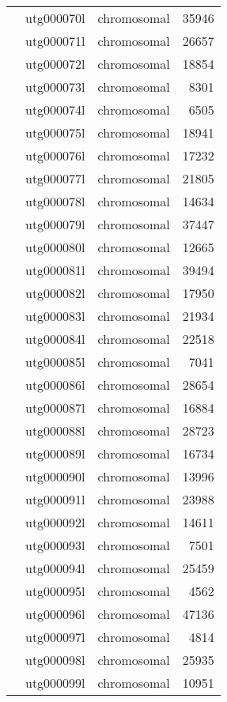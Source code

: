 {\begin{supertabular}{llcr}
          & utg000070l & chromosomal & 35946 \\
          & utg000071l & chromosomal & 26657 \\
          & utg000072l & chromosomal & 18854 \\
          & utg000073l & chromosomal & 8301 \\
          & utg000074l & chromosomal & 6505 \\
          & utg000075l & chromosomal & 18941 \\
          & utg000076l & chromosomal & 17232 \\
          & utg000077l & chromosomal & 21805 \\
          & utg000078l & chromosomal & 14634 \\
          & utg000079l & chromosomal & 37447 \\
          & utg000080l & chromosomal & 12665 \\
          & utg000081l & chromosomal & 39494 \\
          & utg000082l & chromosomal & 17950 \\
          & utg000083l & chromosomal & 21934 \\
          & utg000084l & chromosomal & 22518 \\
          & utg000085l & chromosomal & 7041 \\
          & utg000086l & chromosomal & 28654 \\
          & utg000087l & chromosomal & 16884 \\
          & utg000088l & chromosomal & 28723 \\
          & utg000089l & chromosomal & 16734 \\
          & utg000090l & chromosomal & 13996 \\
          & utg000091l & chromosomal & 23988 \\
          & utg000092l & chromosomal & 14611 \\
          & utg000093l & chromosomal & 7501 \\
          & utg000094l & chromosomal & 25459 \\
          & utg000095l & chromosomal & 4562 \\
          & utg000096l & chromosomal & 47136 \\
          & utg000097l & chromosomal & 4814 \\
          & utg000098l & chromosomal & 25935 \\
          & utg000099l & chromosomal & 10951 \\

\end{supertabular}}
